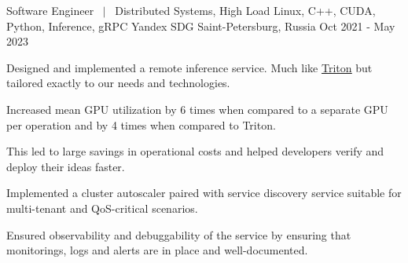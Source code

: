 \begin{cventries}
    \cventry
    {
        Software Engineer $~\mid~$
        Distributed Systems, High Load
        Linux, C++, CUDA, Python,
        Inference, gRPC
    } %
    {Yandex SDG} %
    {Saint-Petersburg, Russia} %
    {Oct 2021 - May 2023} %
    {
        \begin{cvitems}
        \item {
          Designed and implemented a remote inference service.
          Much like \underline{\href{https://github.com/triton-inference-server/server}{Triton}}
          but tailored exactly to our needs and technologies.
        }
        \item {
          Increased mean GPU utilization by 6 times when compared to a separate
          GPU per operation and by 4 times when compared to Triton.
        }
        \item {
          This led to large savings in operational costs and helped developers verify and deploy their ideas faster.
        }
        \item {
          Implemented a cluster autoscaler paired with service discovery
          service suitable for multi-tenant and QoS-critical scenarios.
        }
        \item {
          Ensured observability and debuggability of the service by ensuring
          that monitorings, logs and alerts are in place and well-documented.
        }
        \end{cvitems}
    }




\end{cventries}
